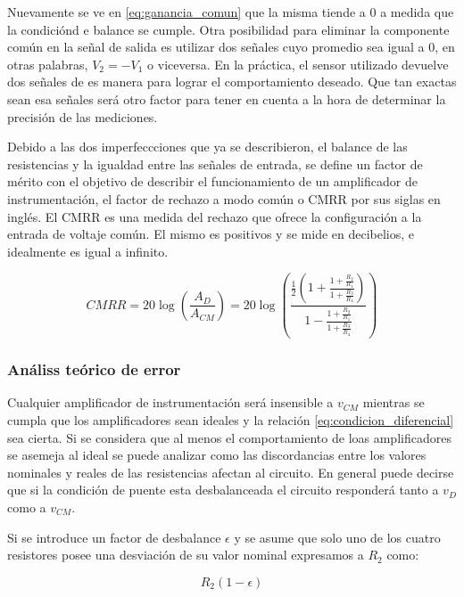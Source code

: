 Nuevamente se ve en \ref{eq:ganancia_comun} que la misma tiende a 0 a medida que la condiciónd e balance se cumple. Otra posibilidad para eliminar la componente común en la señal de salida es utilizar dos señales cuyo promedio sea igual a 0, en otras palabras, $V_2 = - V_1$ o viceversa. En la práctica, el sensor utilizado devuelve dos señales de es manera para lograr el comportamiento deseado. Que tan exactas sean esa señales será otro factor para tener en cuenta a la hora de determinar la precisión de las mediciones. 


Debido a las dos imperfeccciones que ya se describieron, el balance de las resistencias y la igualdad entre las señales de entrada, se define un factor de mérito con el objetivo de describir el funcionamiento de un amplificador de instrumentación, el factor de rechazo a modo común o CMRR por sus siglas en inglés. El CMRR es una medida del rechazo que ofrece la configuración a la entrada de  voltaje común. El mismo es positivos y se mide en decibelios, e idealmente es igual a infinito.

\begin{equation}\label{eq:CMRR}
CMRR   =   20\log(\frac{A_D}{A_{CM}})   = 20\log(\frac{\frac{1}{2}(1 + \frac{1 + \frac{R_2}{R_1}}{1 + \frac{R_3}{R_4}})}{1 - \frac{1 + \frac{R_2}{R_1}}{1 + \frac{R_3}{R_4}}})
\end{equation}

\subsubsection{Análiss teórico de error}
Cualquier amplificador de instrumentación será insensible a $v_{CM}$ mientras se cumpla que los amplificadores sean ideales y la relación \ref{eq:condicion_diferencial} sea cierta. Si se considera que al menos el comportamiento de loas amplificadores se asemeja al ideal se puede analizar como las discordancias entre los valores nominales y reales de las resistencias afectan al circuito. En general puede decirse que si la condición de puente esta desbalanceada el circuito responderá tanto a $v_D$ como a $v_{CM}$.

Si se introduce un factor de desbalance $\epsilon$ y se asume que solo uno de los cuatro resistores posee una desviación de su valor nominal expresamos a $R_2$ como:

\begin{equation}\label{R_2_epsilon}
R_2(1 - \epsilon)
\end{equation} 

